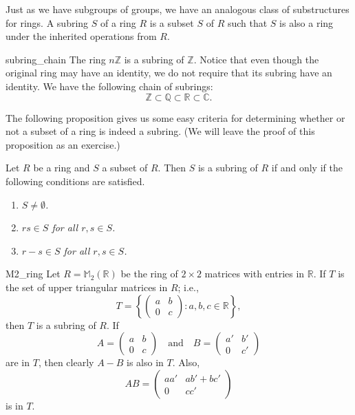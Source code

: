  
\medskip
 
 
Just as we have subgroups of groups, we have an analogous class of 
\mbox{substructures} for rings. A {\bfi subring} $S$ 
of a ring
$R$ is a subset $S$ of $R$ such that $S$ is also a ring under the
inherited operations from $R$.
 
 
\begin{example}{subring_chain}
The ring $n {\mathbb Z}$ is a subring of ${\mathbb Z}$.  Notice that even
though the original ring may have an identity, we do not require
that its subring have an identity. We have the following chain of
subrings: 
\[
{\mathbb Z} \subset {\mathbb Q} \subset {\mathbb R} \subset {\mathbb C}.
\]
\end{example}
 
 

 
 
The following proposition gives us some easy criteria for determining
whether or not a  subset of a ring is indeed a subring. (We will leave
the proof of this proposition as an exercise.)
 
 
\begin{proposition}
Let $R$ be a ring and $S$ a subset of $R$.  Then $S$ is a subring of
$R$ if and only if the following conditions are satisfied. 
\begin{enumerate}
 
\rm \item \it
$S \neq \emptyset$.
 
\rm \item \it
$rs \in S$ for all $r, s \in S$.
 
\rm \item \it
$r-s \in S$ for all $r, s \in S$.
 
\end{enumerate}
\end{proposition}
 
 
\begin{example}{M2_ring}
Let  $R ={\mathbb M}_2( {\mathbb R} )$ be the ring of $2 \times 2$ matrices
with entries in ${\mathbb R}$. If $T$ is the set of upper triangular
matrices in $R$; i.e.,
\[
T =
\left\{
\begin{pmatrix}
a & b \\
0 & c
\end{pmatrix}
: a, b, c \in {\mathbb R}
\right\},
\]
then $T$ is a subring of $R$. If
\[
A=
\begin{pmatrix}
a & b \\
0 & c
\end{pmatrix}
\quad \text{and} \quad
B =
\begin{pmatrix}
a' & b' \\
0 & c'
\end{pmatrix}
\]
are in $T$, then clearly $A-B$ is also in $T$. Also,
\[
AB =
\begin{pmatrix}
a a' & ab' + bc' \\
0 & cc'
\end{pmatrix}
\]
is in $T$.
\end{example}
 
